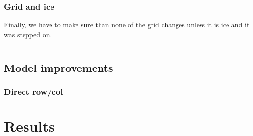 \documentclass{article}
\begin{document}
\subsubsection{Grid and ice}
Finally, we have to make sure than none of the grid changes unless it is ice and it was stepped on.

\begin{lstlisting}

\end{lstlisting}

\subsection{Model improvements}

\subsubsection{Direct row/col}


\section{Results}
\end{document}
